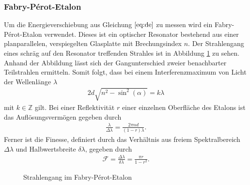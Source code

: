 \subsubsection{Fabry-Pérot-Etalon}
Um die Energieverschiebung aus Gleichung $\ref{eq:de}$ zu messen wird ein Fabry-Pérot-Etalon verwendet. Dieses ist ein optischer Resonator bestehend aus einer planparallelen, verspiegelten Glasplatte mit Brechungsindex $n$. Der Strahlengang eines schräg auf den Resonator treffenden Strahles ist in Abbildung \ref{fig:fabry} zu sehen. Anhand der Abbildung lässt sich der Gangunterschied zweier benachbarter Teilstrahlen ermitteln. Somit folgt, dass bei einem Interferenzmaximum von Licht der Wellenlänge $\lambda$
\begin{align*}
  2d\sqrt{n^2-\sin^2(\alpha)}=k\lambda
\end{align*}
mit $k \in \mathbb{Z}$ gilt. Bei einer Reflektivität $r$ einer einzelnen Oberfläche des Etalons ist das Auflösungsvermögen gegeben durch
\begin{align*}
  \frac{\lambda}{\Delta \lambda}=\frac{2 \pi n d}{(1-r)\lambda}.
\end{align*}
Ferner ist die Finesse, definiert durch das Verhältnis aus freiem Spektralbereich $\Delta \lambda$ und Halbwertsbreite $\delta \lambda$, gegeben durch
\begin{align*}
  \mathcal{F}=\frac{\Delta \lambda}{\delta \lambda}=\frac{\pi r}{1-r^2}.
\end{align*} 

\begin{figure}[h]
  \centering
  \caption{Strahlengang im Fabry-Pérot-Etalon}
  \label{fig:fabry}
\end{figure}
